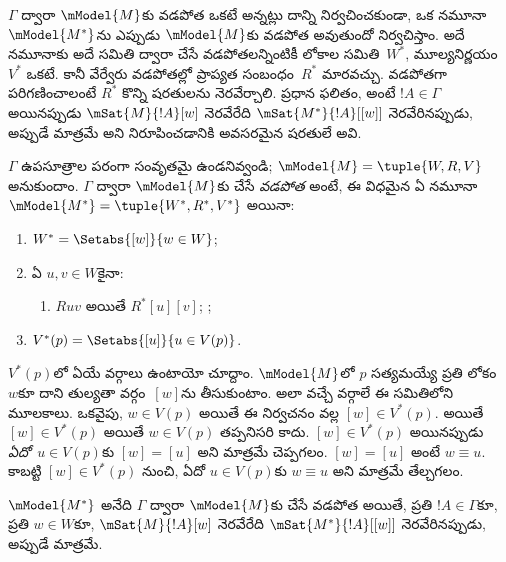 \documentclass[../../../include/open-logic-section]{subfiles}
\begin{document}


$\Gamma$ ద్వారా $\mModel{M}$కు వడపోత ఒకటే అన్నట్లు దాన్ని
నిర్వచించకుండా, ఒక నమూనా~$\mModel{M^*}$ను ఎప్పుడు
$\mModel{M}$కు వడపోత అవుతుందో నిర్వచిస్తాం. అదే నమూనాకు అదే సమితి ద్వారా చేసే వడపోతలన్నింటికీ
లోకాల సమితి~$W^*$, మూల్యనిర్ణయం~$V^*$ ఒకటే. కానీ వేర్వేరు వడపోతల్లో
ప్రాప్యత సంబంధం~$R^*$ మారవచ్చు.
వడపోతగా పరిగణించాలంటే $R^*$ కొన్ని షరతులను
నెరవేర్చాలి. ప్రధాన ఫలితం, అంటే $!A \in \Gamma$
అయినప్పుడు $\mSat{M}{!A}[w]$ నెరవేరేది
$\mSat{M^*}{!A}[{[w]}]$ నెరవేరినప్పుడు, అప్పుడే మాత్రమే అని నిరూపించడానికి
అవసరమైన షరతులే అవి.

\begin{defn}
  $\Gamma$ ఉపసూత్రాల పరంగా సంవృతమై ఉండనివ్వండి;
  $\mModel{M} = \tuple{W, R, V}$ అనుకుందాం.
  $\Gamma$ ద్వారా $\mModel{M}$కు చేసే \emph{వడపోత}
  అంటే, ఈ విధమైన ఏ నమూనా $\mModel{M^*} = \tuple{W^*,R^*,V^*}$ అయినా:
  \begin{enumerate}
  \item $W^* = \Setabs{[w]}{w \in W}$;
  \item {}%
    ఏ $u,v \in W$కైనా:
    \begin{enumerate}
    \item {}%
      $Ruv$ అయితే $R^*[u][v]$;
    ;
    \end{enumerate}
  \item $V^*(p) = \Setabs{[u]}{u \in V(p)}$.
  \end{enumerate}
\end{defn}

$V^*(p)$లో ఏయే వర్గాలు ఉంటాయో చూద్దాం.
$\mModel{M}$లో $p$ సత్యమయ్యే ప్రతి లోకం~$w$కూ
దాని తుల్యతా వర్గం~$[w]$ను తీసుకుంటాం. అలా వచ్చే
వర్గాలే ఈ సమితిలోని మూలకాలు.
ఒకవైపు, $w \in V(p)$ అయితే ఈ నిర్వచనం వల్ల
$[w] \in V^*(p)$. అయితే $[w] \in V^*(p)$ అయితే
$w \in V(p)$ తప్పనిసరి కాదు. $[w] \in V^*(p)$
అయినప్పుడు \emph{ఏదో}~$u \in V(p)$కు $[w] = [u]$
అని మాత్రమే చెప్పగలం. $[w] = [u]$ అంటే $w \equiv u$.
కాబట్టి $[w] \in V^*(p)$ నుంచి, ఏదో $u \in
V(p)$కు $w \equiv u$ అని మాత్రమే తేల్చగలం.

\begin{thm}
  $\mModel{M^*}$ అనేది $\Gamma$ ద్వారా
  $\mModel{M}$కు చేసే వడపోత అయితే, ప్రతి
  $!A \in \Gamma$కూ, ప్రతి $w \in W$కూ,
  $\mSat{M}{!A}[w]$ నెరవేరేది
  $\mSat{M^*}{!A}[{[w]}]$ నెరవేరినప్పుడు, అప్పుడే మాత్రమే.
\end{thm}
\end{document}
